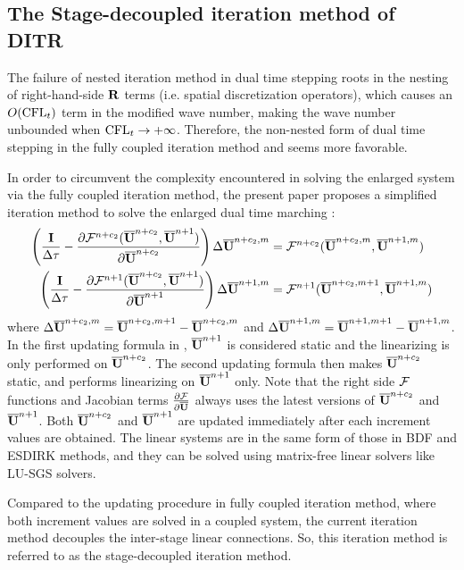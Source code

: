 \documentclass[preprint,12pt]{elsarticle}
\begin{document}
\subsection{The Stage-decoupled iteration method of DITR}

The failure of nested iteration method in dual time stepping
roots in the nesting of right-hand-side $\mathbf{R}$ terms
(i.e. spatial  discretization operators), which
causes an $O(\text{CFL}_t)$ term in the modified wave number,
making the wave number unbounded when $\text{CFL}_t\rightarrow + \infty$.
Therefore, the non-nested form of dual time stepping in
the fully coupled iteration method  and 
seems more favorable.

In order to circumvent the complexity encountered in solving the enlarged
system via the fully coupled iteration method, the present paper
proposes a simplified iteration method to solve the enlarged dual time marching
:
\begin{equation}
    \begin{aligned}
        \left(\frac{\eye}{\inc\tau} -
        \partialderivative{\FF^{n+c_2}(\uu^{n+c_2}, \uu^{n+1})}{\uu^{n+c_2}}  \right)
        \inc\uu^{n+c_2,m} & = \FF^{n+c_2}(\uu^{n+c_2,m}, \uu^{n+1,m}) \\
        \left(\frac{\eye}{\inc\tau} -
        \partialderivative{\FF^{n+1}(\uu^{n+c_2}, \uu^{n+1})}{\uu^{n+1}}  \right)
        \inc\uu^{n+1,m}   & = \FF^{n+1}(\uu^{n+c_2,m+1}, \uu^{n+1,m}) \\
    \end{aligned}
    \label{eq:DITRSDS}
\end{equation}
where $\mathrm\Delta \overline{\mathbf{U}}^{n+c_2,m} = \overline{\mathbf{U}}^{n+c_2,m+1} - \overline{\mathbf{U}}^{n+c_2,m}$ and
$\mathrm\Delta \overline{\mathbf{U}}^{n+1,m} = \overline{\mathbf{U}}^{n+1,m+1} - \overline{\mathbf{U}}^{n+1,m}$.
In the first updating formula in ,
$\overline{\mathbf{U}}^{n+1}$ is considered static and the linearizing is only
performed on $\overline{\mathbf{U}}^{n+c_2}$. The second updating formula
then makes $\overline{\mathbf{U}}^{n+c_2}$ static, and performs linearizing on
$\overline{\mathbf{U}}^{n+1}$ only. Note that the right side $\mathcal{F}$ functions
and Jacobian terms $\partialderivative{\FF}{\uu}$ always
uses the latest versions of $\overline{\mathbf{U}}^{n+c_2}$ and $\overline{\mathbf{U}}^{n+1}$.
Both $\overline{\mathbf{U}}^{n+c_2}$ and $\overline{\mathbf{U}}^{n+1}$ are updated immediately
after each increment values are obtained. 
The linear systems are in the same form 
of those in BDF and ESDIRK methods, and they 
can be solved using matrix-free linear solvers like 
LU-SGS solvers.

Compared to the updating procedure in fully coupled iteration method,
where both increment values are solved in a coupled system,
the current iteration method decouples the inter-stage linear connections.
So, this iteration method is referred to as the stage-decoupled iteration method.
\end{document}
